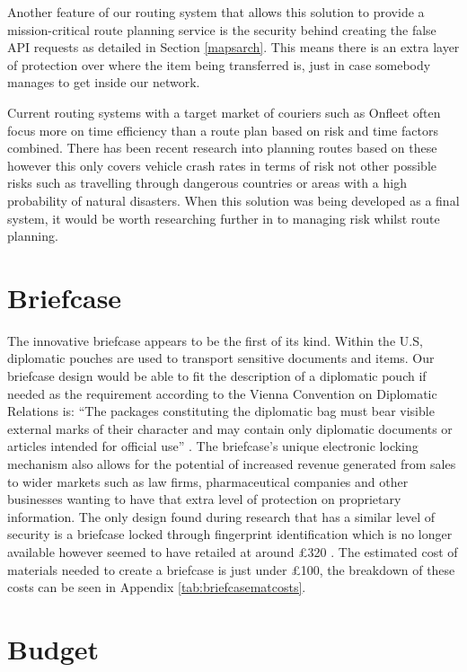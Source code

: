 Another feature of our routing system that allows this solution to provide a mission-critical route planning service is the security behind creating the false API requests as detailed in Section \ref{mapsarch}. This means there is an extra layer of protection over where the item being transferred is, just in case somebody manages to get inside our network. 

Current routing systems with a target market of couriers such as Onfleet \cite{onfleet} often focus more on time efficiency than a route plan based on risk and time factors combined. There has been recent research into planning routes based on these \cite{krumm2017risk} however this only covers vehicle crash rates in terms of risk not other possible risks such as travelling through dangerous countries or areas with a high probability of natural disasters. When this solution was being developed as a final system, it would be worth researching further in to managing risk whilst route planning.

\section{Briefcase} \label{briefcasemarket}

The innovative briefcase appears to be the first of its kind. Within the U.S, diplomatic pouches are used to transport sensitive documents and items. Our briefcase design would be able to fit the description of a diplomatic pouch if needed as the requirement according to the Vienna Convention on Diplomatic Relations is: “The packages constituting the diplomatic bag must bear visible external marks of their character and may contain only diplomatic documents or articles intended for official use” \cite{viennaConvention}. The briefcase’s unique electronic locking mechanism also allows for the potential of increased revenue generated from sales to wider markets such as law firms, pharmaceutical companies and other businesses wanting to have that extra level of protection on proprietary information. The only design found during research that has a similar level of security is a briefcase locked through fingerprint identification which is no longer available however seemed to have retailed at around £320 \cite{fingerprintBriefcase} \cite{biometricBriefcase}. The estimated cost of materials needed to create a briefcase is just under £100, the breakdown of these costs can be seen in Appendix \ref{tab:briefcasematcosts}. 

\section{Budget}

